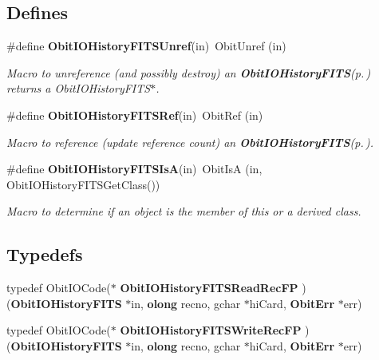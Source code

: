 \subsection*{Defines}
\begin{CompactItemize}
\item 
\#define {\bf Obit\-IOHistory\-FITSUnref}(in)\ Obit\-Unref (in)
\begin{CompactList}\small\item\em Macro to unreference (and possibly destroy) an {\bf Obit\-IOHistory\-FITS}{\rm (p.\,\pageref{structObitIOHistoryFITS})} returns a Obit\-IOHistory\-FITS$\ast$. \item\end{CompactList}\item 
\#define {\bf Obit\-IOHistory\-FITSRef}(in)\ Obit\-Ref (in)
\begin{CompactList}\small\item\em Macro to reference (update reference count) an {\bf Obit\-IOHistory\-FITS}{\rm (p.\,\pageref{structObitIOHistoryFITS})}. \item\end{CompactList}\item 
\#define {\bf Obit\-IOHistory\-FITSIs\-A}(in)\ Obit\-Is\-A (in, Obit\-IOHistory\-FITSGet\-Class())
\begin{CompactList}\small\item\em Macro to determine if an object is the member of this or a derived class. \item\end{CompactList}\end{CompactItemize}
\subsection*{Typedefs}
\begin{CompactItemize}
\item 
typedef Obit\-IOCode($\ast$ {\bf Obit\-IOHistory\-FITSRead\-Rec\-FP} )({\bf Obit\-IOHistory\-FITS} $\ast$in, {\bf olong} recno, gchar $\ast$hi\-Card, {\bf Obit\-Err} $\ast$err)
\item 
typedef Obit\-IOCode($\ast$ {\bf Obit\-IOHistory\-FITSWrite\-Rec\-FP} )({\bf Obit\-IOHistory\-FITS} $\ast$in, {\bf olong} recno, gchar $\ast$hi\-Card, {\bf Obit\-Err} $\ast$err)
\end{CompactItemize}
